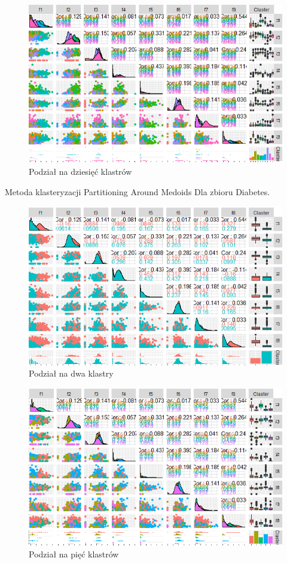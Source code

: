 \documentclass[12pt,a4paper]{article}
\begin{document}
\begin{figure}[H]
\centering
\includegraphics[width=1\textwidth]{diabetesK10.PNG}
\caption{Podział na dziesięć klastrów}
\end{figure}

Metoda klasteryzacji Partitioning Around Medoids Dla zbioru Diabetes.

\begin{figure}[H]
\centering
\includegraphics[width=1\textwidth]{diabetesP2.PNG}
\caption{Podział na dwa klastry}
\end{figure}

\begin{figure}[H]
\centering
\includegraphics[width=1\textwidth]{diabetesP5.PNG}
\caption{Podział na pięć klastrów}
\end{figure}
\end{document}

